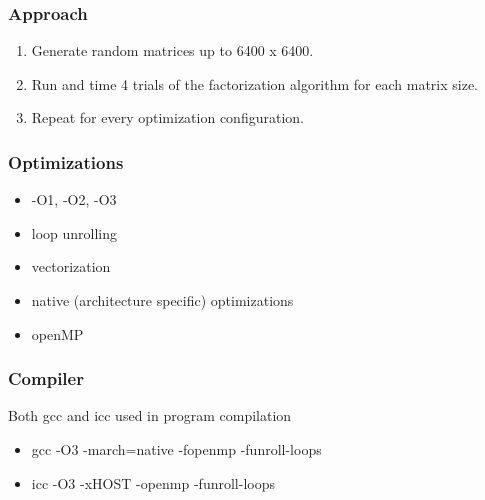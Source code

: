 \documentclass{beamer}
\begin{document}
\begin{frame}
\frametitle{Approach}
\begin{enumerate}
\item Generate random matrices up to 6400 x 6400.
\item Run and time 4 trials of the factorization algorithm for each matrix size.
\item Repeat for every optimization configuration.
\end{enumerate}
\end{frame}

\begin{frame}
\frametitle{Optimizations}

\begin{itemize}
\item -O1, -O2, -O3
\item loop unrolling
\item vectorization
\item native (architecture specific) optimizations
\item openMP
\end{itemize}

\end{frame}

\begin{frame}
\frametitle{Compiler}
Both gcc and icc used in program compilation
\begin{itemize}
\item gcc -O3 -march=native -fopenmp -funroll-loops
\item icc -O3 -xHOST -openmp -funroll-loops
\end{itemize}

\end{frame}
\end{document}
